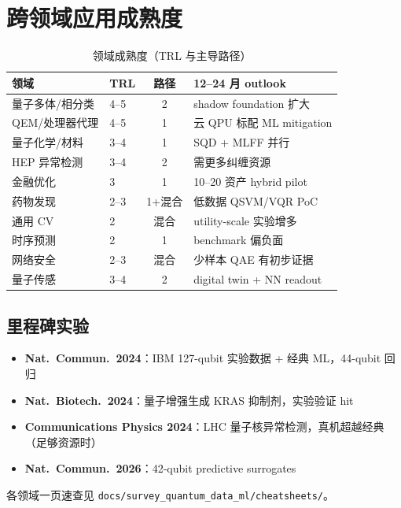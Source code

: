 \section{跨领域应用成熟度}
\label{sec:applications}

\begin{table}[htbp]
  \centering
  \caption{领域成熟度（TRL 与主导路径）}
  \small
  \begin{tabular}{@{}llcl@{}}
    \toprule
    领域 & TRL & 路径 & 12--24 月 outlook \\
    \midrule
    量子多体/相分类 & 4--5 & 2 & shadow foundation 扩大 \\
    QEM/处理器代理 & 4--5 & 1 & 云 QPU 标配 ML mitigation \\
    量子化学/材料 & 3--4 & 1 & SQD + MLFF 并行 \\
    HEP 异常检测 & 3--4 & 2 & 需更多纠缠资源 \\
    金融优化 & 3 & 1 & 10--20 资产 hybrid pilot \\
    药物发现 & 2--3 & 1+混合 & 低数据 QSVM/VQR PoC \\
    通用 CV & 2 & 混合 & utility-scale 实验增多 \\
    时序预测 & 2 & 1 & benchmark 偏负面 \\
    网络安全 & 2--3 & 混合 & 少样本 QAE 有初步证据 \\
    量子传感 & 3--4 & 2 & digital twin + NN readout \\
    \bottomrule
  \end{tabular}
\end{table}

\subsection{里程碑实验}

\begin{itemize}[leftmargin=*]
  \item \textbf{Nat.\ Commun.\ 2024}：IBM 127-qubit 实验数据 + 经典 ML，44-qubit 回归~\cite{Cho2024ExpMLQuantumData}
  \item \textbf{Nat.\ Biotech.\ 2024}：量子增强生成 KRAS 抑制剂，实验验证 hit~\cite{KRASQuantumDrug2024}
  \item \textbf{Communications Physics 2024}：LHC 量子核异常检测，真机超越经典（足够资源时）~\cite{LHCQuantumAnomaly2024}
  \item \textbf{Nat.\ Commun.\ 2026}：42-qubit predictive surrogates~\cite{PredictiveSurrogates2026}
\end{itemize}

各领域一页速查见 \texttt{docs/survey\_quantum\_data\_ml/cheatsheets/}。
